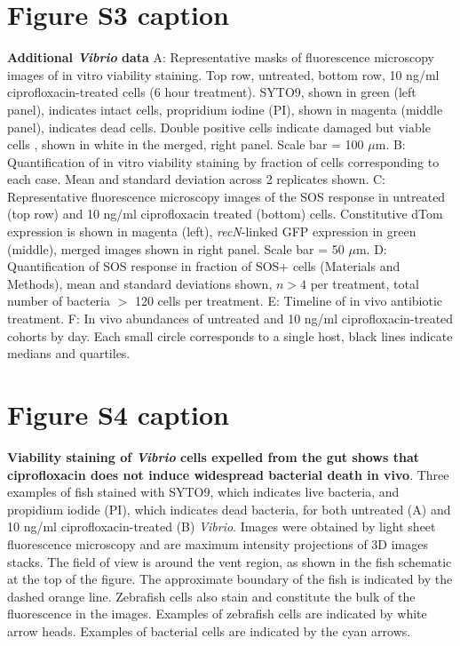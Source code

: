 \documentclass[12pt]{article}
\begin{document}
\section*{Figure S3 caption}
\textbf{Additional \textit{Vibrio} data}  A: Representative masks of fluorescence microscopy images of in vitro viability staining. Top row, untreated, bottom row, 10 ng/ml ciprofloxacin-treated cells (6 hour treatment). SYTO9, shown in green (left panel), indicates intact cells, propridium iodine (PI), shown in magenta (middle panel), indicates dead cells. Double positive cells indicate damaged but viable cells \cite{ben2005genetic}, shown in white in the merged, right panel. Scale bar = 100 $\mu$m. B: Quantification of in vitro viability staining by fraction of cells corresponding to each case. Mean and standard deviation across 2 replicates shown. C: Representative fluorescence microscopy images of the SOS response in untreated (top row) and 10 ng/ml ciprofloxacin treated (bottom) cells. Constitutive dTom expression is shown in magenta (left), \textit{recN}-linked GFP expression in green (middle), merged images shown in right panel. Scale bar = 50 $\mu$m. D: Quantification of SOS response in fraction of SOS+ cells (Materials and Methods), mean and standard deviations shown, $n>4$ per treatment, total number of bacteria $>$ 120 cells per treatment. E: Timeline of in vivo antibiotic treatment. F: In vivo abundances of untreated and 10 ng/ml ciprofloxacin-treated cohorts by day. Each small circle corresponds to a single host, black lines indicate medians and quartiles. 

\section*{Figure S4 caption}
\textbf{Viability staining of \textit{Vibrio} cells expelled from the gut shows that ciprofloxacin does not induce widespread bacterial death in vivo}. Three examples of fish stained with SYTO9, which indicates live bacteria, and propidium iodide (PI), which indicates dead bacteria, for both untreated (A) and 10 ng/ml ciprofloxacin-treated (B) \textit{Vibrio}. Images were obtained by light sheet fluorescence microscopy and are maximum intensity projections of 3D images stacks. The field of view is around the vent region, as shown in the fish schematic at the top of the figure. The approximate boundary of the fish is indicated by the dashed orange line. Zebrafish cells also stain and constitute the bulk of the fluorescence in the images. Examples of zebrafish cells are indicated by white arrow heads. Examples of bacterial cells are indicated by the cyan arrows.
\end{document}
